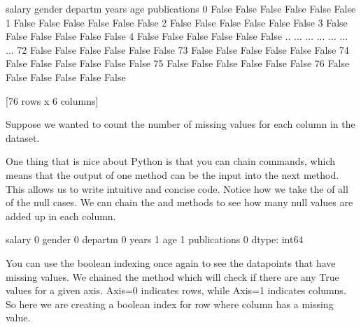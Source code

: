 \documentclass[letterpaper,10pt,english]{sphinxmanual}
\begin{document}
\begin{sphinxVerbatim}[commandchars=\\\{\}]
    salary  gender  departm  years    age  publications
0    False   False    False  False  False         False
1    False   False    False  False  False         False
2    False   False    False  False  False         False
3    False   False    False  False  False         False
4    False   False    False  False  False         False
..     ...     ...      ...    ...    ...           ...
72   False   False    False  False  False         False
73   False   False    False  False  False         False
74   False   False    False  False  False         False
75   False   False    False  False  False         False
76   False   False    False  False  False         False

[76 rows x 6 columns]
\end{sphinxVerbatim}

Suppose we wanted to count the number of missing values for each column in the dataset.

One thing that is  nice about Python is that you can chain commands, which means that the output of one method can be the input into the next method.  This allows us to write intuitive and concise code.  Notice how we take the  of all of the null cases.
We can chain the  and  methods to see how many null values are added up in each column.

\begin{sphinxVerbatim}[commandchars=\\\{\}]
\end{sphinxVerbatim}

\begin{sphinxVerbatim}[commandchars=\\\{\}]
salary          0
gender          0
departm         0
years           1
age             1
publications    0
dtype: int64
\end{sphinxVerbatim}

You can use the boolean indexing once again to see the datapoints that have missing values. We chained the method  which will check if there are any True values for a given axis.  Axis=0 indicates rows, while Axis=1 indicates columns.  So here we are creating a boolean index for row where  column has a missing value.
\end{document}
